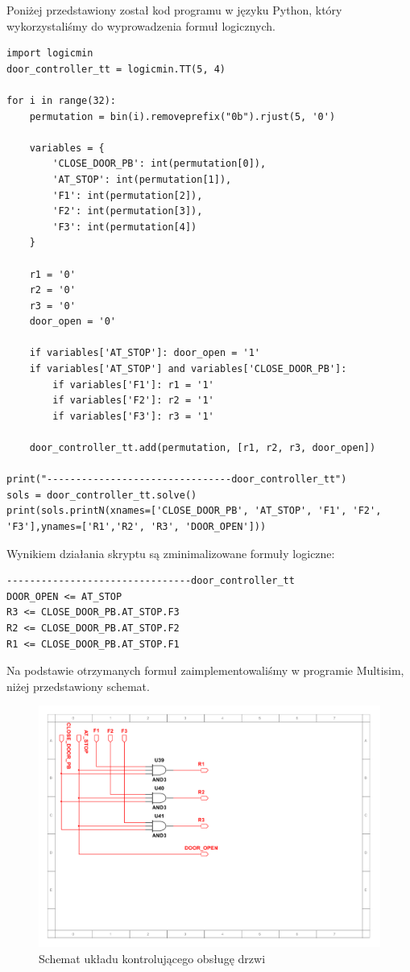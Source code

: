 \documentclass[a4paper]{article}
\begin{document}
Poniżej przedstawiony został kod programu w języku Python, który wykorzystaliśmy do wyprowadzenia
formuł logicznych.
\begin{verbatim}
import logicmin
door_controller_tt = logicmin.TT(5, 4)

for i in range(32):
    permutation = bin(i).removeprefix("0b").rjust(5, '0')
    
    variables = {
        'CLOSE_DOOR_PB': int(permutation[0]),
        'AT_STOP': int(permutation[1]),
        'F1': int(permutation[2]),
        'F2': int(permutation[3]),
        'F3': int(permutation[4])
    }

    r1 = '0'
    r2 = '0'
    r3 = '0'
    door_open = '0'

    if variables['AT_STOP']: door_open = '1'
    if variables['AT_STOP'] and variables['CLOSE_DOOR_PB']:
        if variables['F1']: r1 = '1'
        if variables['F2']: r2 = '1'
        if variables['F3']: r3 = '1'

    door_controller_tt.add(permutation, [r1, r2, r3, door_open])

print("--------------------------------door_controller_tt")
sols = door_controller_tt.solve()
print(sols.printN(xnames=['CLOSE_DOOR_PB', 'AT_STOP', 'F1', 'F2', 'F3'],ynames=['R1','R2', 'R3', 'DOOR_OPEN']))
\end{verbatim}
Wynikiem działania skryptu są zminimalizowane formuły logiczne:

\begin{verbatim}
--------------------------------door_controller_tt
DOOR_OPEN <= AT_STOP
R3 <= CLOSE_DOOR_PB.AT_STOP.F3
R2 <= CLOSE_DOOR_PB.AT_STOP.F2
R1 <= CLOSE_DOOR_PB.AT_STOP.F1
\end{verbatim}

\pagebreak
Na podstawie otrzymanych formuł zaimplementowaliśmy w programie Multisim,
niżej przedstawiony schemat.

\begin{figure}[H]
    \centering
    \includegraphics[width=\textwidth]{door_controller_schemat.pdf}
    \caption{Schemat układu kontrolującego obsługę drzwi}
\end{figure}
\end{document}
